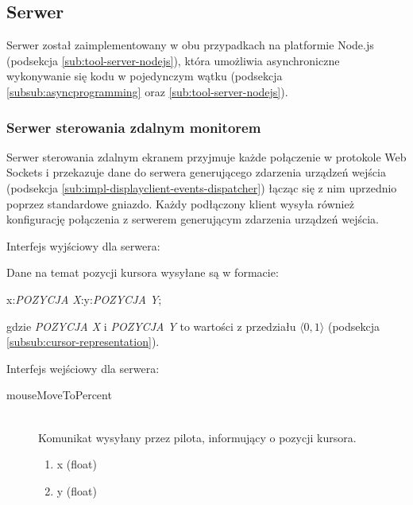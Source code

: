 \subsection{Serwer}

Serwer został zaimplementowany w obu przypadkach na platformie Node.js (podsekcja \ref{sub:tool-server-nodejs}), która umożliwia asynchroniczne wykonywanie się kodu w pojedynczym wątku (podsekcja \ref{subsub:asyncprogramming} oraz \ref{sub:tool-server-nodejs}).

\subsubsection{Serwer sterowania zdalnym monitorem}

Serwer sterowania zdalnym ekranem przyjmuje każde połączenie w protokole Web Sockets i przekazuje dane do serwera generującego zdarzenia urządzeń wejścia (podsekcja \ref{sub:impl-displayclient-events-dispatcher}) łącząc się z nim uprzednio poprzez standardowe gniazdo. Każdy podłączony klient wysyła również konfigurację połączenia z serwerem generującym zdarzenia urządzeń wejścia.

\par \hfill

\noindent
Interfejs wyjściowy dla serwera:

\par \hfill

\noindent
Dane na temat pozycji kursora wysyłane są w formacie:

\par \hfill

\noindent
x:\emph{POZYCJA X}:y:\emph{POZYCJA Y};

\par \hfill

\noindent
gdzie \emph{POZYCJA X} i \emph{POZYCJA Y} to wartości z przedziału \(\langle0, 1\rangle\) (podsekcja \ref{subsub:cursor-representation}).

\par \hfill

Interfejs wejściowy dla serwera:

\begin{description}
	\item[mouseMoveToPercent] \hfill \\
	Komunikat wysyłany przez pilota, informujący o pozycji kursora.
	\begin{enumerate}
		\item x (float)
		\item y (float)
	\end{enumerate}
\end{description}


